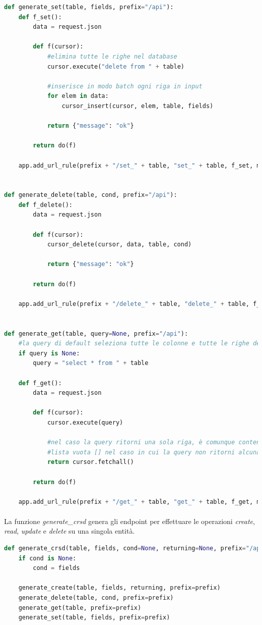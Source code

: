 \documentclass[11pt,a4paper,english]{article}
\begin{document}
\begin{lstlisting}[language=python, caption=Funzioni \emph{generate\_*}]
def generate_set(table, fields, prefix="/api"):
    def f_set():
        data = request.json

        def f(cursor):
            #elimina tutte le righe nel database
            cursor.execute("delete from " + table)

            #inserisce in modo batch ogni riga in input
            for elem in data:
                cursor_insert(cursor, elem, table, fields)

            return {"message": "ok"}

        return do(f)

    app.add_url_rule(prefix + "/set_" + table, "set_" + table, f_set, methods=["POST"])


def generate_delete(table, cond, prefix="/api"):
    def f_delete():
        data = request.json

        def f(cursor):
            cursor_delete(cursor, data, table, cond)

            return {"message": "ok"}

        return do(f)

    app.add_url_rule(prefix + "/delete_" + table, "delete_" + table, f_delete, methods=["DELETE"])


def generate_get(table, query=None, prefix="/api"):
    #la query di default seleziona tutte le colonne e tutte le righe della tabella
    if query is None:
        query = "select * from " + table

    def f_get():
        data = request.json

        def f(cursor):
            cursor.execute(query)

            #nel caso la query ritorni una sola riga, è comunque contenuta in una lista unitaria [row1]
            #lista vuota [] nel caso in cui la query non ritorni alcuna riga
            return cursor.fetchall()

        return do(f)

    app.add_url_rule(prefix + "/get_" + table, "get_" + table, f_get, methods=["GET"])
\end{lstlisting}

\paragraph{} La funzione \emph{generate\_crsd} genera gli endpoint per effettuare le operazioni \emph{create}, \emph{read}, \emph{update} e \emph{delete} su una singola entità.

\begin{lstlisting}[language=python, caption=generate\_crsd]
def generate_crsd(table, fields, cond=None, returning=None, prefix="/api"):
    if cond is None:
        cond = fields

    generate_create(table, fields, returning, prefix=prefix)
    generate_delete(table, cond, prefix=prefix)
    generate_get(table, prefix=prefix)
    generate_set(table, fields, prefix=prefix)
\end{lstlisting}
\end{document}

